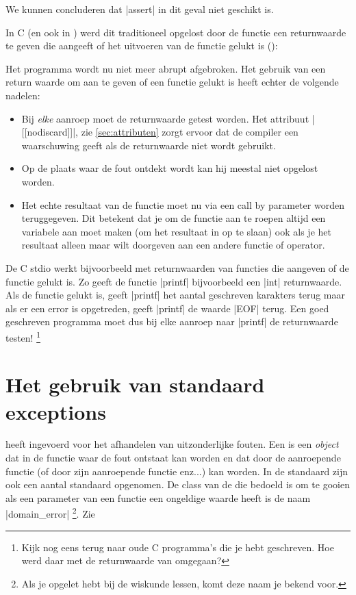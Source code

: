 \begin{cpplstShortInline}
We kunnen concluderen dat |assert| in dit geval niet geschikt is.

\label{sec:boolreturnwaarde}
In C (en ook in \Cpp{}) werd dit traditioneel opgelost door de functie een returnwaarde te geven die
aangeeft of het uitvoeren van de functie gelukt is ():


Het programma wordt nu niet meer abrupt afgebroken.
Het gebruik van een return waarde om aan te geven of een functie gelukt is heeft echter de volgende nadelen:
\begin{itemize}
    \item Bij \emph{elke} aanroep moet de returnwaarde getest worden.
    Het attribuut |[[nodiscard]]|, zie \cref{sec:attributen} zorgt ervoor dat de compiler een waarschuwing geeft als de returnwaarde niet wordt gebruikt.
    \item Op de plaats waar de fout ontdekt wordt kan hij meestal niet opgelost worden.
    \item Het echte resultaat van de functie moet nu via een call by  parameter worden teruggegeven.
    Dit betekent dat je om de functie aan te roepen altijd een variabele aan moet maken (om het resultaat in op te slaan) ook als je het resultaat alleen maar wilt doorgeven aan een andere functie of operator.
\end{itemize}
De C  stdio werkt bijvoorbeeld met returnwaarden van functies die aangeven of de functie gelukt is.
Zo geeft de functie |printf| bijvoorbeeld een |int| returnwaarde.
Als de functie gelukt is, geeft |printf| het aantal geschreven karakters terug maar als er een error is opgetreden, geeft |printf| de
waarde |EOF| terug.
Een goed geschreven programma moet dus bij elke aanroep naar |printf| de returnwaarde testen!%
\footnote{%
    Kijk nog eens terug naar oude C programma's die je hebt geschreven.
    Hoe werd daar met de returnwaarde van  omgegaan?}
\section{Het gebruik van standaard exceptions}
\Cpp{} heeft \emph{} ingevoerd voor het afhandelen van uitzonderlijke fouten.
Een  is een \emph{object} dat in de functie waar de fout ontstaat  kan worden en dat door de aanroepende functie (of door zijn aanroepende  functie enz...)  kan worden.
In de standaard  zijn ook een aantal standaard  opgenomen.
De class van de  die bedoeld is om te gooien als een parameter van een functie een ongeldige waarde heeft is de naam |domain_error|%
\footnote{%
    Als je opgelet hebt bij de wiskunde lessen, komt deze naam je bekend voor.
}. Zie 


\end{cpplstShortInline}
